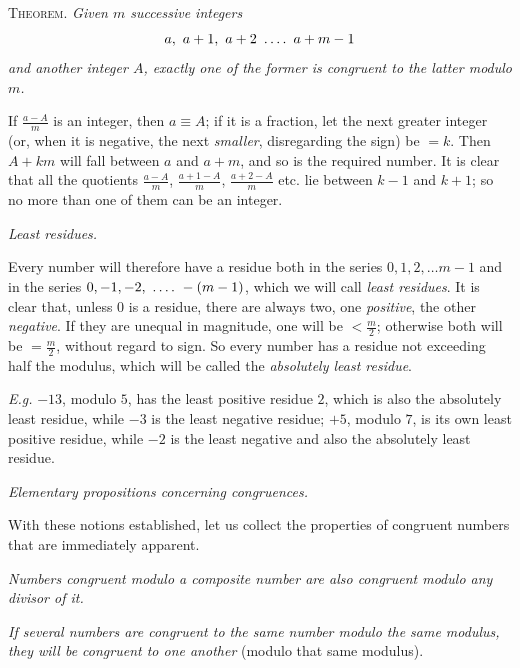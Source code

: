 
\textsc{Theorem.} \emph{Given $m$ successive integers}
\[
a,\ a+1,\ a+2\ \GaussFourDots\ a+m-1
\]
\emph{and another integer $A$, exactly one of the former is congruent to the latter modulo $m$.}

If $\frac{a-A}{m}$ is an integer, then $a\equiv A$; if it is a fraction, let the next greater integer (or, when it is negative, the next \emph{smaller}, disregarding the sign) be $=k$. Then $A+km$ will fall between $a$ and $a+m$, and so is the required number. It is clear that all the quotients $\frac{a-A}{m}$, $\frac{a+1-A}{m}$, $\frac{a+2-A}{m}$ etc. lie between $k-1$ and $k+1$; so no more than one of them can be an integer.

\begin{center}\emph{Least residues.}\end{center}

Every number will therefore have a residue both in the series $0, 1, 2,\ldots m-1$ and in the series $0, -1, -2,\ \GaussFourDots\ -(m-1)$, which we will call \emph{least residues}. It is clear that, unless $0$ is a residue, there are always two, one \emph{positive}, the other \emph{negative}. If they are unequal in magnitude, one will be $<\frac{m}{2}$; otherwise both will be $=\frac{m}{2}$, without regard to sign. So every number has a residue not exceeding half the modulus, which will be called the \emph{absolutely least residue}.

\emph{E.g.} $-13$, modulo $5$, has the least positive residue $2$, which is also the absolutely least residue, while $-3$ is the least negative residue; $+5$, modulo $7$, is its own least positive residue, while $-2$ is the least negative and also the absolutely least residue.

\begin{center}\emph{Elementary propositions concerning congruences.}\end{center}

With these notions established, let us collect the properties of congruent numbers that are immediately apparent.

\emph{Numbers congruent modulo a composite number are also congruent modulo any divisor of it.}

\emph{If several numbers are congruent to the same number modulo the same modulus, they will be congruent to one another} (modulo that same modulus).

